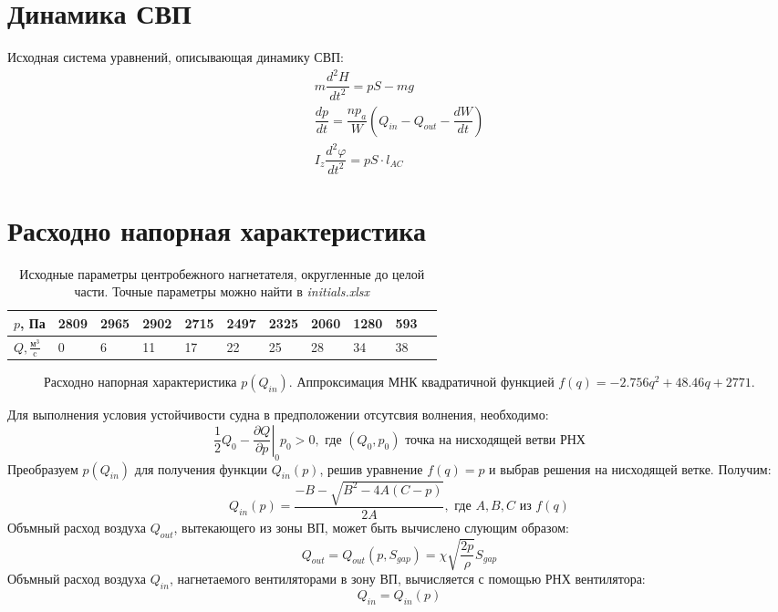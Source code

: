 \documentclass{article}%
\newcommand\at[2]{\left.#1\right|_{#2}}
\numberwithin{equation}{subsection}
\let\oldsection\section%
\renewcommand{\section}{%
  \renewcommand{\theequation}{\thesection.\arabic{equation}}%
  \oldsection}%
\begin{document}
\section{Динамика СВП}
Исходная система уравнений, описывающая динамику СВП:
\begin{equation}
\begin{gathered}
    m\dfrac{d^2H}{dt^2}=pS-mg\\
    \dfrac{dp}{dt}=\dfrac{np_a}{W}\left(Q_{in} - Q_{out} -\dfrac{dW}{dt}\right)\\
    I_z\dfrac{d^2\varphi}{dt^2}=pS\cdot l_{AC}
\end{gathered}
\label{eq:1.1}
\end{equation}

\section{Расходно напорная характеристика}
\begin{table}[h]
    \caption{Исходные параметры центробежного нагнетателя, округленные до целой части. Точные параметры можно найти в {\it initials.xlsx}}
    \centering
    \begin{tabular}{@{}l*{10}{l}@{}}
        \toprule
        $p$, Па & 2809 & 2965 & 2902 & 2715 & 2497 & 2325 & 2060 & 1280 & 593 \\
        \midrule
        $Q, \frac{\text{м}^3}{\text{c}}$ & 0 & 6 & 11 & 17 & 22 & 25 & 28 & 34 & 38 \\
        \bottomrule
    \end{tabular}
\end{table}
\begin{figure}[H]
    \centering
    
    \caption{Расходно напорная характеристика $p(Q_{in})$. Аппроксимация МНК квадратичной функцией $f(q)=-2.756q^2 + 48.46q + 2771$.}
\end{figure}
Для выполнения условия устойчивости судна в предположении отсутсвия волнения, необходимо:
\begin{equation}
    \dfrac{1}{2}Q_0 - \at{\dfrac{\partial Q}{\partial p}}{0}p_0 > 0, \text{ где } (Q_0, p_0) \text{ точка на нисходящей ветви РНХ}
\end{equation} 
Преобразуем $p(Q_{in})$ для получения функции $Q_{in}(p)$, решив уравнение $f(q)=p$ и выбрав решения на нисходящей ветке. Получим:
\begin{equation}
    Q_{in}(p)=\dfrac{-B-\sqrt{B^2-4A(C-p)}}{2A}, \text{ где } A, B, C \text{ из } f(q)
\end{equation}
Объмный расход воздуха $Q_{out}$, вытекающего из зоны ВП, может быть вычислено слующим образом:
\begin{equation}
    Q_{out}=Q_{out}(p, S_{gap})=\chi\sqrt{\dfrac{2p}{\rho}}S_{gap}
\end{equation}
Объмный расход воздуха $Q_{in}$, нагнетаемого вентиляторами в зону ВП, вычисляется с помощью РНХ вентилятора:
\begin{equation}
    Q_{in}=Q_{in}(p)
\end{equation}
\end{document}
